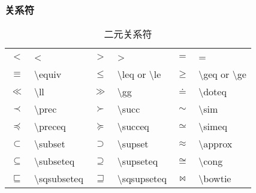 \documentclass[a4paper]{ctexart}
\begin{document}
    \subsubsection{关系符}
    \begin{table}[H]
        \centering
        \caption{二元关系符}
        \begin{tabular}{clclcl}
            \toprule
            $<$             & <                         & $>$           & >                                         & 
            $=$             & =                                                                                     \\
            $\equiv$        & \textbackslash equiv      & $\leq$        & \textbackslash leq or \textbackslash le   & 
            $\geq$          & \textbackslash geq or \textbackslash ge                                               \\
            $\ll$           & \textbackslash ll         & $\gg$         & \textbackslash gg                         & 
            $\doteq$        & \textbackslash doteq                                                                  \\
            $\prec$         & \textbackslash prec       & $\succ$       & \textbackslash succ                       &
            $\sim$          & \textbackslash sim                                                                    \\
            $\preceq$       & \textbackslash preceq     & $\succeq$     & \textbackslash succeq                     &
            $\simeq$        & \textbackslash simeq                                                                  \\
            $\subset$       & \textbackslash subset     & $\supset$     & \textbackslash supset                     &
            $\approx$       & \textbackslash approx                                                                 \\
            $\subseteq$     & \textbackslash subseteq   & $\supseteq$   & \textbackslash supseteq                   &
            $\cong$         & \textbackslash cong                                                                   \\
            $\sqsubseteq$   & \textbackslash sqsubseteq & $\sqsupseteq$ & \textbackslash sqsupseteq                 & 
            $\bowtie$       & \textbackslash bowtie                                                                 \\

\end{tabular}
\end{table}
\end{document}
